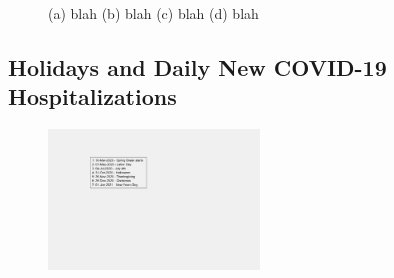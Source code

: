 \documentclass[]{article}
\begin{document}
\begin{figure}
	\caption{(a) blah (b) blah (c) blah (d) blah}
	\label{fig:foobar}
\end{figure}

\FloatBarrier
\vspace{5mm}

\subsection{Holidays and Daily New COVID-19 Hospitalizations}

\begin{figure}[!h]
	\centering
	\includegraphics[width=0.50\textwidth]{legends/holiday_legend.png}
	\caption{}
	\label{fig:legends/holiday_legendLabel}
\end{figure}
\end{document}
